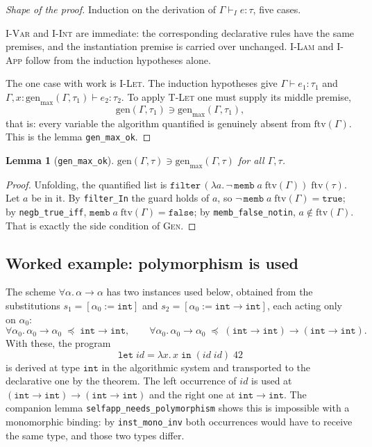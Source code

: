 \documentclass[11pt,a4paper]{article}
\newtheorem{lemma}[theorem]{Lemma}
\newcommand{\tint}{\mathtt{int}}
\newcommand{\ftv}{\mathrm{ftv}}
\newcommand{\gen}{\mathrm{gen}}
\newcommand{\genmax}{\mathrm{gen}_{\max}}
\newcommand{\inst}{\preceq}
\begin{document}
\begin{proof}[Shape of the proof]
Induction on the derivation of $\Gamma \vdash_{\!I} e : \tau$, five cases.

\textsc{I-Var} and \textsc{I-Int} are immediate: the corresponding declarative
rules have the same premises, and the instantiation premise is carried over
unchanged.  \textsc{I-Lam} and \textsc{I-App} follow from the induction
hypotheses alone.

The one case with work is \textsc{I-Let}.  The induction hypotheses give
$\Gamma \vdash e_1 : \tau_1$ and
$\Gamma, x{:}\genmax(\Gamma,\tau_1) \vdash e_2 : \tau_2$.  To apply
\textsc{T-Let} one must supply its middle premise,
\[
  \gen(\Gamma,\tau_1) \ni \genmax(\Gamma,\tau_1),
\]
that is: every variable the algorithm quantified is genuinely absent from
$\ftv(\Gamma)$.  This is the lemma \texttt{gen\_max\_ok}.
\end{proof}

\begin{lemma}[\texttt{gen\_max\_ok}]
  $\gen(\Gamma,\tau) \ni \genmax(\Gamma,\tau)$ for all $\Gamma, \tau$.
\end{lemma}

\begin{proof}
Unfolding, the quantified list is
$\mathtt{filter}\,(\lambda a.\,\neg\,\mathtt{memb}\;a\;\ftv(\Gamma))\;\ftv(\tau)$.
Let $a$ be in it.  By \texttt{filter\_In} the guard holds of $a$, so
$\neg\,\mathtt{memb}\;a\;\ftv(\Gamma) = \mathtt{true}$; by
\texttt{negb\_true\_iff}, $\mathtt{memb}\;a\;\ftv(\Gamma) = \mathtt{false}$; by
\texttt{memb\_false\_notin}, $a \notin \ftv(\Gamma)$.  That is exactly the side
condition of \textsc{Gen}.
\end{proof}

\subsection{Worked example: polymorphism is used}

The scheme $\forall\alpha.\,\alpha \to \alpha$ has two instances used below,
obtained from the substitutions $s_1 = [\alpha_0 := \tint]$ and
$s_2 = [\alpha_0 := \tint \to \tint]$, each acting only on $\alpha_0$:
\[
  \forall\alpha_0.\,\alpha_0 \to \alpha_0 \;\inst\; \tint \to \tint,
  \qquad
  \forall\alpha_0.\,\alpha_0 \to \alpha_0 \;\inst\;
  (\tint \to \tint) \to (\tint \to \tint).
\]
With these, the program
\[
  \mathtt{let}\;\mathit{id} = \lambda x.\,x\;\mathtt{in}\;
  (\mathit{id}\;\mathit{id})\;42
\]
is derived at type $\tint$ in the algorithmic system and transported to the
declarative one by the theorem.  The left occurrence of $\mathit{id}$ is used at
$(\tint \to \tint) \to (\tint \to \tint)$ and the right one at
$\tint \to \tint$.  The companion lemma
\texttt{selfapp\_needs\_polymorphism} shows this is impossible with a
monomorphic binding: by \texttt{inst\_mono\_inv} both occurrences would have to
receive the same type, and those two types differ.
\end{document}
